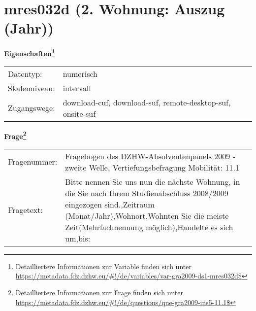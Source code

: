 
    \setcounter{footnote}{0}

    \vspace*{-1.8cm}
	\section{mres032d (2. Wohnung: Auszug (Jahr))}
	\label{section:mres032d}



    \vspace*{0.5cm}
    \noindent\textbf{Eigenschaften\footnote{Detailliertere Informationen zur Variable finden sich unter
		\url{https://metadata.fdz.dzhw.eu/\#!/de/variables/var-gra2009-ds1-mres032d$}}}\\
	\begin{tabularx}{\hsize}{@{}lX}
	Datentyp: & numerisch \\
	Skalenniveau: & intervall \\
	Zugangswege: &
	  download-cuf, 
	  download-suf, 
	  remote-desktop-suf, 
	  onsite-suf
 \\
    \end{tabularx}



				\vspace*{0.5cm}
                \noindent\textbf{Frage\footnote{Detailliertere Informationen zur Frage finden sich unter
		              \url{https://metadata.fdz.dzhw.eu/\#!/de/questions/que-gra2009-ins5-11.1$}}}\\
				\begin{tabularx}{\hsize}{@{}lX}
					Fragenummer: &
					  Fragebogen des DZHW-Absolventenpanels 2009 - zweite Welle, Vertiefungsbefragung Mobilität:
					  11.1
 \\
					Fragetext: & Bitte nennen Sie uns nun die nächste Wohnung, in die Sie nach Ihrem Studienabschluss 2008/2009 eingezogen sind.,Zeitraum (Monat/Jahr),Wohnort,Wohnten Sie die meiste Zeit(Mehrfachnennung möglich),Handelte es sich um,bis: \\
				\end{tabularx}





